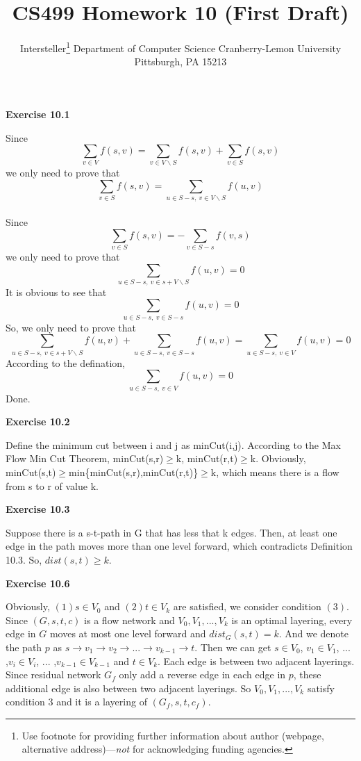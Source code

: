 \documentclass{article} %
\title{CS499 Homework 10 (First Draft)}
\author{
	Intersteller\thanks{ Use footnote for providing further information
		about author (webpage, alternative address)---\emph{not} for acknowledging
		funding agencies.}
	Department of Computer Science
	Cranberry-Lemon University
	Pittsburgh, PA 15213
}
\begin{document}
	
	
	\maketitle
	
	
	\textbf{Exercise 10.1}\par
	Since $$\sum_{v\in V}f(s,v)=\sum_{v\in V\backslash S}f(s,v)+\sum_{v\in S}f(s,v)$$ we only need to prove that $$\sum_{v\in S}f(s,v)=\sum_{u\in S-s,\ v\in V\backslash S}f(u,v)$$\\
	Since $$\sum_{v\in S}f(s,v)=-\sum_{v\in S-s}f(v,s)$$ we only need to prove that $$\sum_{u\in S-s,\ v\in s+V\backslash S}f(u,v)=0$$
	It is obvious to see that $$\sum_{u\in S-s,\ v\in S-s}f(u,v)=0$$
	So, we only need to prove that $$\sum_{u\in S-s,\ v\in s+V\backslash S}f(u,v)+\sum_{u\in S-s,\ v\in S-s}f(u,v)=\sum_{u\in S-s,\ v\in V}f(u,v)=0$$
	According to the defination, $$\sum_{u\in S-s,\ v\in V}f(u,v)=0$$
	Done.


	\textbf{Exercise 10.2}\par
	Define the minimum cut between i and j as minCut(i,j). According to the Max Flow Min Cut Theorem, minCut(s,r)$\geq$k, minCut(r,t)$\geq$k. Obviously, minCut(s,t)$\geq$min\{minCut(s,r),minCut(r,t)\}$\geq$k, which means there is a flow from s to r of value k.

	\textbf{Exercise 10.3}\par
	Suppose there is a s-t-path in G that has less that k edges. Then, at least one edge in the path moves more than one level forward, which contradicts Definition 10.3. So, $dist(s,t)\geq k$.

	
	\textbf{Exercise 10.6}\par
	Obviously, $(1)s\in V_{0}$ and $(2)t\in V_{k}$ are satisfied, we consider condition $(3)$. Since $(G,s,t,c)$ is a flow network 
	and $V_{0},V_{1},...,V_{k}$ is an optimal layering, every edge in $G$ moves at most one level forward and $dist_G(s,t)=k$. And we denote the path $p$ 
	as $s\rightarrow v_{1}\rightarrow v_{2} \rightarrow ...\rightarrow v_{k-1} \rightarrow t $. Then we can get  $s\in V_{0}$, $v_{1}\in V_{1}$, ... ,$v_{i}\in V_{i}$, ... ,$v_{k-1}\in V_{k-1}$ and $t\in V_{k}$. Each edge is between two adjacent layerings. Since residual network $G_{f}$ only add a reverse edge in each edge in $p$, these additional edge is also between two adjacent layerings. So $V_{0},V_{1},...,V_{k}$ satisfy condition $3$ and it is a layering of $(G_{f},s,t,c_{f})$.\par
	
\end{document}
